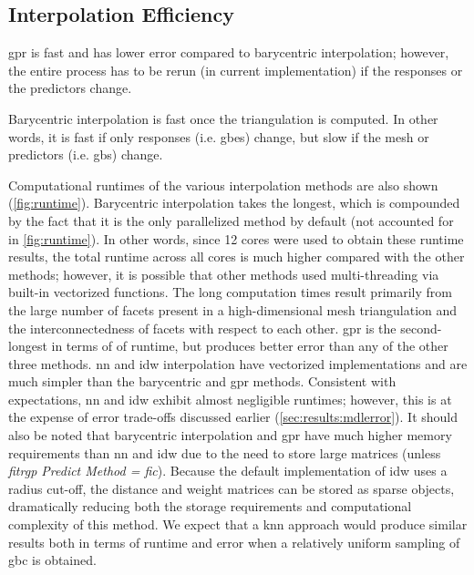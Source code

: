 \documentclass[preprint,12pt]{elsarticle}
\begin{document}
\subsection{Interpolation Efficiency}
\label{sec:results:efficiency}


\Gls{gpr} is fast and has lower error compared to barycentric interpolation; however, the entire process has to be rerun (in current implementation) if the responses or the predictors change.

Barycentric interpolation is fast once the triangulation is computed. In other words, it is fast if only responses (i.e. \glspl{gbe}) change, but slow if the mesh or predictors (i.e. \glspl{gb}) change.

Computational runtimes of the various interpolation methods are also shown (\cref{fig:runtime}). Barycentric interpolation takes the longest, which is compounded by the fact that it is the only parallelized method by default (not accounted for in \cref{fig:runtime}). In other words, since 12 cores were used to obtain these runtime results, the total runtime across all cores is much higher compared with the other methods; however, it is possible that other methods used multi-threading via built-in vectorized functions. The long computation times result primarily from the large number of facets present in a high-dimensional mesh triangulation and the interconnectedness of facets with respect to each other. \Gls{gpr} is the second-longest in terms of of runtime, but produces better error than any of the other three methods. \Gls{nn} and \gls{idw} interpolation have vectorized implementations and are much simpler than the barycentric and \gls{gpr} methods. Consistent with expectations, \gls{nn} and \gls{idw} exhibit almost negligible runtimes; however, this is at the expense of error trade-offs discussed earlier (\cref{sec:results:mdlerror}). It should also be noted that barycentric interpolation and \gls{gpr} have much higher memory requirements than \gls{nn} and \gls{idw} due to the need to store large matrices (unless \textit{fitrgp Predict Method = \gls{fic}}). Because the default implementation of \gls{idw} uses a radius cut-off, the distance and weight matrices can be stored as sparse objects, dramatically reducing both the storage requirements and computational complexity of this method. We expect that a \gls{knn} approach would produce similar results both in terms of runtime and error when a relatively uniform sampling of \gls{gbc} is obtained.
\end{document}

